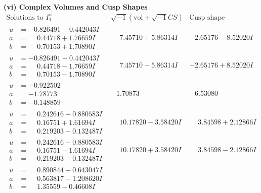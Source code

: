 \documentclass[1p]{elsarticle_modified}
\theoremstyle{definition}
\newcommand{\I}{\sqrt{-1}}
\begin{document}
\newpage\flushleft \textbf{(vi) Complex Volumes and Cusp Shapes}
$$\begin{array}{c|c|c}  
\text{Solutions to }I^u_{1}& \I (\text{vol} + \sqrt{-1}CS) & \text{Cusp shape}\\
 \hline 
\begin{aligned}
u &= -0.826491 + 0.442043 I \\
a &= \phantom{-}0.44718 + 1.76659 I \\
b &= \phantom{-}0.70153 + 1.70890 I\end{aligned}
 & \phantom{-}7.45710 + 5.86314 I & -2.65176 - 8.52020 I \\ \hline\begin{aligned}
u &= -0.826491 - 0.442043 I \\
a &= \phantom{-}0.44718 - 1.76659 I \\
b &= \phantom{-}0.70153 - 1.70890 I\end{aligned}
 & \phantom{-}7.45710 - 5.86314 I & -2.65176 + 8.52020 I \\ \hline\begin{aligned}
u &= -0.922502\phantom{ +0.000000I} \\
a &= -1.78773\phantom{ +0.000000I} \\
b &= -0.148859\phantom{ +0.000000I}\end{aligned}
 & -1.70873\phantom{ +0.000000I} & -6.53080\phantom{ +0.000000I} \\ \hline\begin{aligned}
u &= \phantom{-}0.242616 + 0.880583 I \\
a &= \phantom{-}0.16751 + 1.61694 I \\
b &= \phantom{-}0.219203 - 0.132487 I\end{aligned}
 & \phantom{-}10.17820 - 3.58420 I & \phantom{-}3.84598 + 2.12866 I \\ \hline\begin{aligned}
u &= \phantom{-}0.242616 - 0.880583 I \\
a &= \phantom{-}0.16751 - 1.61694 I \\
b &= \phantom{-}0.219203 + 0.132487 I\end{aligned}
 & \phantom{-}10.17820 + 3.58420 I & \phantom{-}3.84598 - 2.12866 I \\ \hline\begin{aligned}
u &= \phantom{-}0.890844 + 0.643047 I \\
a &= \phantom{-}0.563817 - 1.208620 I \\
b &= \phantom{-}1.35559 - 0.46608 I\end{aligned}

\end{array}$$
\end{document}
